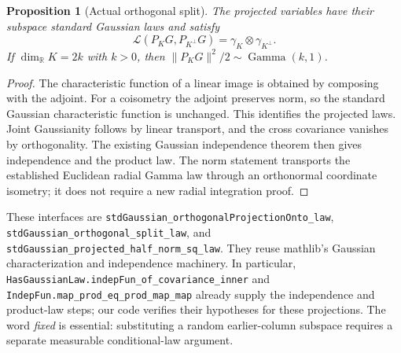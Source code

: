 \documentclass[11pt]{article}
\newtheorem{proposition}[theorem]{Proposition}
\newcommand{\R}{\mathbb R}
\newcommand{\Law}{\mathcal L}
\newcommand{\lean}[1]{{\small\nolinkurl{#1}}}
\begin{document}
\begin{proposition}[Actual orthogonal split]\label{thm:split}
The projected variables have their subspace standard Gaussian laws and satisfy
\[
 \Law(P_KG,P_{K^\perp}G)=\gamma_K\otimes\gamma_{K^\perp}.
\]
If $\dim_\R K=2k$ with $k>0$, then
$\|P_KG\|^2/2\sim\operatorname{Gamma}(k,1)$.
\end{proposition}
\begin{proof}
The characteristic function of a linear image is obtained by composing with
the adjoint. For a coisometry the adjoint preserves norm, so the standard
Gaussian characteristic function is unchanged. This identifies the projected
laws. Joint Gaussianity follows by linear transport, and the cross covariance
vanishes by orthogonality. The existing Gaussian independence theorem then
gives independence and the product law. The norm statement transports the
established Euclidean radial Gamma law through an orthonormal coordinate
isometry; it does not require a new radial integration proof.
\end{proof}
These interfaces are
\lean{stdGaussian_orthogonalProjectionOnto_law},
\lean{stdGaussian_orthogonal_split_law}, and
\lean{stdGaussian_projected_half_norm_sq_law}.
They reuse mathlib's Gaussian characterization and independence machinery.
In particular, \lean{HasGaussianLaw.indepFun_of_covariance_inner} and
\lean{IndepFun.map_prod_eq_prod_map_map} already supply the independence and
product-law steps; our code verifies their hypotheses for these projections.
The word \emph{fixed} is essential: substituting a random earlier-column
subspace requires a separate measurable conditional-law argument.
\end{document}
